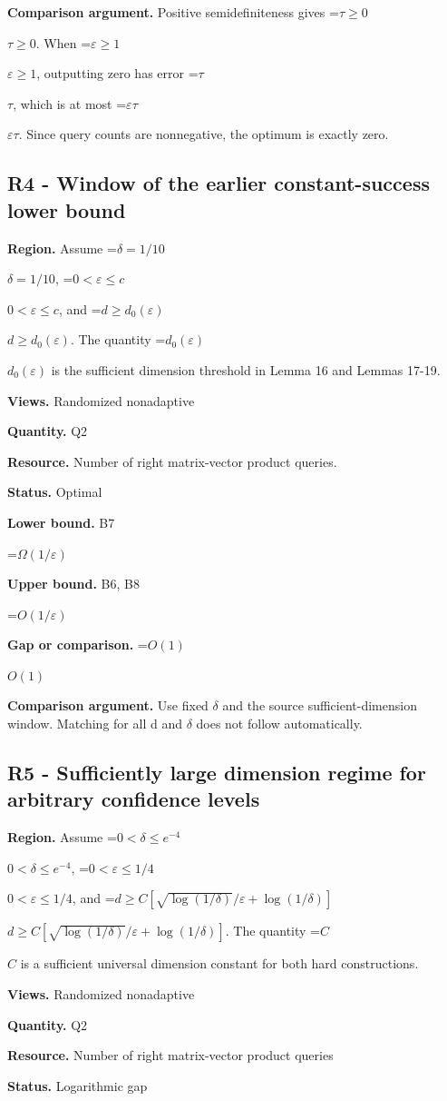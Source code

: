 \documentclass[10pt,a4paper]{article}
\newcommand{\AtlasMath}[1]{\par\begingroup\centering\setbox0=\hbox{$\displaystyle #1$}\ifdim\wd0>1.4\linewidth\typeout{ATLAS WIDE FORMULA: \the\wd0}\fi\ifdim\wd0>\linewidth\resizebox{\linewidth}{!}{\box0}\else\box0\fi\par\endgroup}
\newcommand{\AtlasInlineMath}[1]{\begingroup\setbox0=\hbox{$#1$}\ifdim\wd0>.4\linewidth\endgroup\AtlasMath{#1}\else\endgroup$#1$\fi}
\begin{document}
\textbf{Comparison argument.} Positive semidefiniteness gives \AtlasInlineMath{\tau\ge0}. When \AtlasInlineMath{\varepsilon\ge1}, outputting zero has error \AtlasInlineMath{\tau}, which is at most \AtlasInlineMath{\varepsilon\tau}. Since query counts are nonnegative, the optimum is exactly zero.

\subsection{R4 - Window of the earlier constant-success lower bound}
\textbf{Region.} Assume \AtlasInlineMath{\delta=1/10}, \AtlasInlineMath{0<\varepsilon\le c}, and \AtlasInlineMath{d\ge d_0(\varepsilon)}. The quantity \AtlasInlineMath{d_0(\varepsilon)} is the sufficient dimension threshold in Lemma 16 and Lemmas 17-19.

\textbf{Views.} Randomized nonadaptive

\textbf{Quantity.} Q2

\textbf{Resource.} Number of right matrix-vector product queries.

\textbf{Status.} Optimal

\textbf{Lower bound.} B7

\AtlasMath{\Omega(1/\varepsilon)}
\textbf{Upper bound.} B6, B8

\AtlasMath{O(1/\varepsilon)}
\textbf{Gap or comparison.} \AtlasInlineMath{O(1)}

\textbf{Comparison argument.} Use fixed $\delta$ and the source sufficient-dimension window. Matching for all d and $\delta$ does not follow automatically.

\subsection{R5 - Sufficiently large dimension regime for arbitrary confidence levels}
\textbf{Region.} Assume \AtlasInlineMath{0<\delta\le e^{-4}}, \AtlasInlineMath{0<\varepsilon\le1/4}, and \AtlasInlineMath{d\ge C[\sqrt{\log(1/\delta)}/\varepsilon+\log(1/\delta)]}. The quantity \AtlasInlineMath{C} is a sufficient universal dimension constant for both hard constructions.

\textbf{Views.} Randomized nonadaptive

\textbf{Quantity.} Q2

\textbf{Resource.} Number of right matrix-vector product queries

\textbf{Status.} Logarithmic gap
\end{document}
